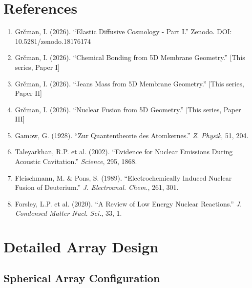 \documentclass[12pt,a4paper]{article}
\begin{document}
\section*{References}

\begin{enumerate}
    \item Grčman, I. (2026). ``Elastic Diffusive Cosmology - Part I.'' Zenodo. DOI: 10.5281/zenodo.18176174
    
    \item Grčman, I. (2026). ``Chemical Bonding from 5D Membrane Geometry.'' [This series, Paper I]
    
    \item Grčman, I. (2026). ``Jeans Mass from 5D Membrane Geometry.'' [This series, Paper II]
    
    \item Grčman, I. (2026). ``Nuclear Fusion from 5D Geometry.'' [This series, Paper III]
    
    \item Gamow, G. (1928). ``Zur Quantentheorie des Atomkernes.'' \textit{Z. Physik}, 51, 204.
    
    \item Taleyarkhan, R.P. et al. (2002). ``Evidence for Nuclear Emissions During Acoustic Cavitation.'' \textit{Science}, 295, 1868.
    
    \item Fleischmann, M. \& Pons, S. (1989). ``Electrochemically Induced Nuclear Fusion of Deuterium.'' \textit{J. Electroanal. Chem.}, 261, 301.
    
    \item Forsley, L.P. et al. (2020). ``A Review of Low Energy Nuclear Reactions.'' \textit{J. Condensed Matter Nucl. Sci.}, 33, 1.
\end{enumerate}

\appendix
\section{Detailed Array Design}

\subsection{Spherical Array Configuration}
\end{document}
